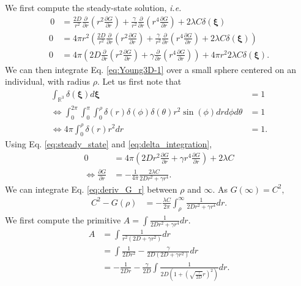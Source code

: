 \documentclass[12pt,english]{article}
\begin{document}
We first compute the steady-state solution,\textit{ i.e.} 
\begin{align}
\,0 & =\frac{2D}{r^{2}}\frac{\partial}{\partial r}\left(r^{2}\frac{\partial G}{\partial r}\right)+\frac{\gamma}{r^{2}}\frac{\partial}{\partial r}\left(r^{4}\frac{\partial G}{\partial r}\right)+2\lambda C\delta(\boldsymbol{\xi})\nonumber \\
0 & =4\pi r^{2}\left(\frac{2D}{r^{2}}\frac{\partial}{\partial r}\left(r^{2}\frac{\partial G}{\partial r}\right)+\frac{\gamma}{r^{2}}\frac{\partial}{\partial r}\left(r^{4}\frac{\partial G}{\partial r}\right)+2\lambda C\delta(\boldsymbol{\boldsymbol{\xi}})\right)\nonumber \\
0 & =4\pi\left(2D\frac{\partial}{\partial r}\left(r^{2}\frac{\partial G}{\partial r}\right)+\gamma\frac{\partial}{\partial r}\left(r^{4}\frac{\partial G}{\partial r}\right)\right)+4\pi r^{2}2\lambda C\delta(\boldsymbol{\boldsymbol{\xi}}).\label{eq:steady_state}
\end{align}
We can then integrate Eq. \ref{eq:Young3D-1} over a small sphere
centered on an individual, with radius $\rho$. Let us first note
that
\begin{align}
\int_{\mathbb{R}^{3}}\delta(\boldsymbol{\xi})d\boldsymbol{\xi} & =1\nonumber \\
\Leftrightarrow\int_{0}^{2\pi}\int_{0}^{\pi}\int_{0}^{\rho}\delta(r)\delta(\phi)\delta(\theta)r{}^{2}\sin(\phi)drd\phi d\theta & =1\nonumber \\
\Leftrightarrow4\pi\int_{0}^{\rho}\delta(r)r{}^{2}dr & =1.\label{eq:delta_integration}
\end{align}
Using Eq. \ref{eq:steady_state} and \ref{eq:delta_integration},
\begin{align}
0 & =4\pi\left(2Dr^{2}\frac{\partial G}{\partial r}+\gamma r^{4}\frac{\partial G}{\partial r}\right)+2\lambda C\nonumber \\
\Leftrightarrow\frac{\partial G}{\partial r} & =-\frac{1}{4\pi}\frac{2\lambda C}{2Dr^{2}+\gamma r^{4}}.\label{eq:deriv_G_r}
\end{align}
We can integrate Eq. \ref{eq:deriv_G_r} between $\rho$ and $\infty$.
As $G(\infty)=C^{2},$ 
\begin{align}
C^{2}-G(\rho) & =-\frac{\lambda C}{2\pi}{\displaystyle \int_{\rho}^{\infty}}\frac{1}{2Dr^{2}+\gamma r^{4}}dr.\label{eq:deriv_G_r_int1}
\end{align}
We first compute the primitive $A=\int\frac{1}{2Dr^{2}+\gamma r^{4}}dr$.
\begin{align}
A & =\int\frac{1}{r^{2}\left(2D+\gamma r^{2}\right)}dr\\
 & =\int\frac{1}{2Dr^{2}}-\frac{\gamma}{2D\left(2D+\gamma r^{2}\right)}dr\\
 & =-\frac{1}{2Dr}-\frac{\gamma}{2D}\int\frac{1}{2D\left(1+\left(\sqrt{\frac{\gamma}{2D}}r\right)^{2}\right)}dr.
\end{align}
\end{document}
